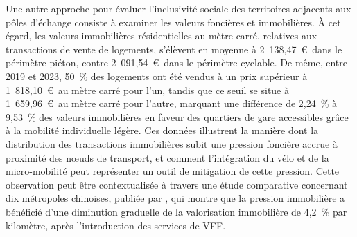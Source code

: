 \begin{refsegment}
Une autre approche pour évaluer l'inclusivité sociale des territoires adjacents aux pôles d'échange consiste à examiner les valeurs foncières et immobilières. À cet égard, les valeurs immobilières résidentielles au mètre carré, relatives aux transactions de vente de logements, s'élèvent en moyenne à 2~138,47~\euro~dans le périmètre piéton, contre 2~091,54~\euro~dans le périmètre cyclable. De même, entre 2019 et 2023, 50~\% des logements ont été vendus à un prix supérieur à 1~818,10~\euro~au mètre carré pour l'un, tandis que ce seuil se situe à 1~659,96~\euro~au mètre carré  pour l'autre, marquant une différence de 2,24~\% à 9,53~\% des valeurs immobilières en faveur des quartiers de gare accessibles grâce à la mobilité individuelle légère. Ces données illustrent la manière dont la distribution des transactions immobilières subit une pression foncière accrue à proximité des nœuds de transport, et comment l'intégration du vélo et de la micro-mobilité peut représenter un outil de mitigation de cette pression. Cette observation peut être contextualisée à travers une étude comparative concernant dix métropoles chinoises, publiée par \textcolor{blue}{\textcite[10]{chu_last_2021}}, qui montre que la pression immobilière a bénéficié d'une diminution graduelle de la valorisation immobilière de 4,2~\% par kilomètre, après l'introduction des services de \acrshort{VFF}.%


\end{refsegment}
